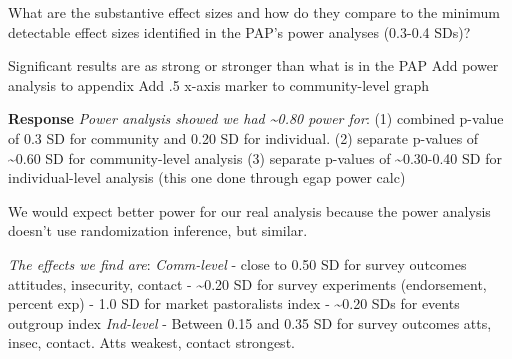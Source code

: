 \documentclass[
]{article}
\begin{document}
What are the substantive effect sizes and how do they compare to the
minimum detectable effect sizes identified in the PAP's power analyses
(0.3-0.4 SDs)?

Significant results are as strong or stronger than what is in the PAP
Add power analysis to appendix Add .5 x-axis marker to community-level
graph

\textbf{Response} \emph{Power analysis showed we had \textasciitilde0.80
power for}: (1) combined p-value of 0.3 SD for community and 0.20 SD for
individual. (2) separate p-values of \textasciitilde0.60 SD for
community-level analysis (3) separate p-values of
\textasciitilde0.30-0.40 SD for individual-level analysis (this one done
through egap power calc)

We would expect better power for our real analysis because the power
analysis doesn't use randomization inference, but similar.

\emph{The effects we find are}: \emph{Comm-level} - close to 0.50 SD for
survey outcomes attitudes, insecurity, contact - \textasciitilde0.20 SD
for survey experiments (endorsement, percent exp) - 1.0 SD for market
pastoralists index - \textasciitilde0.20 SDs for events outgroup index
\emph{Ind-level} - Between 0.15 and 0.35 SD for survey outcomes atts,
insec, contact. Atts weakest, contact strongest.
\end{document}

